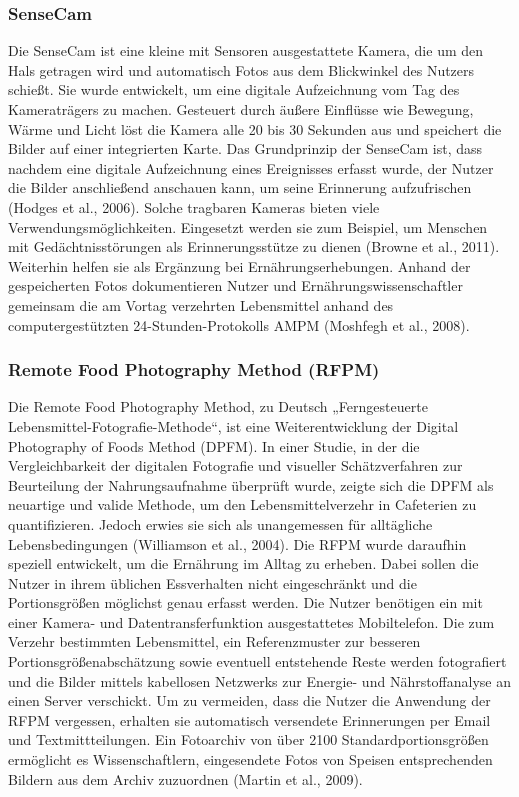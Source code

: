 \subsubsection{SenseCam}

Die SenseCam ist eine kleine mit Sensoren ausgestattete Kamera, die um den Hals getragen wird  und automatisch Fotos aus dem Blickwinkel des Nutzers schießt. Sie wurde entwickelt, um eine digitale Aufzeichnung vom Tag des Kameraträgers zu machen. Gesteuert durch äußere Einflüsse wie Bewegung, Wärme und Licht löst die Kamera alle 20 bis 30 Sekunden aus und speichert die Bilder auf einer integrierten Karte. Das Grundprinzip der SenseCam ist, dass nachdem eine digitale Aufzeichnung eines Ereignisses erfasst wurde, der Nutzer die Bilder anschließend anschauen kann, um seine Erinnerung aufzufrischen (Hodges et al., 2006). Solche tragbaren Kameras bieten viele Verwendungsmöglichkeiten. Eingesetzt werden sie zum Beispiel, um Menschen mit Gedächtnisstörungen als Erinnerungsstütze zu dienen (Browne et al., 2011). Weiterhin helfen sie als Ergänzung bei Ernährungserhebungen. Anhand der gespeicherten Fotos dokumentieren Nutzer und Ernährungswissenschaftler gemeinsam die am Vortag verzehrten Lebensmittel anhand des computergestützten 24-Stunden-Protokolls AMPM (Moshfegh et al., 2008).

\subsubsection{Remote Food Photography Method (RFPM)}

Die Remote Food  Photography Method, zu Deutsch „Ferngesteuerte Lebensmittel-Fotografie-Methode“, ist eine  Weiterentwicklung der Digital Photography of Foods Method (DPFM). In einer Studie, in der die Vergleichbarkeit der digitalen Fotografie und visueller Schätzverfahren zur Beurteilung der Nahrungsaufnahme überprüft wurde, zeigte sich die DPFM als neuartige und valide Methode, um den Lebensmittelverzehr in Cafeterien zu quantifizieren. Jedoch erwies sie sich als  unangemessen für alltägliche Lebensbedingungen (Williamson et al., 2004). Die RFPM wurde daraufhin speziell entwickelt, um die Ernährung im Alltag zu erheben. Dabei sollen die Nutzer in ihrem üblichen Essverhalten nicht eingeschränkt und die Portionsgrößen möglichst genau erfasst werden. Die Nutzer benötigen ein mit einer Kamera- und Datentransferfunktion ausgestattetes Mobiltelefon. Die zum Verzehr bestimmten Lebensmittel, ein Referenzmuster zur besseren Portionsgrößenabschätzung sowie eventuell entstehende Reste werden fotografiert und die Bilder mittels kabellosen Netzwerks zur Energie- und Nährstoffanalyse an einen Server verschickt. Um zu vermeiden, dass die Nutzer die Anwendung der RFPM vergessen, erhalten sie automatisch versendete Erinnerungen per Email und Textmittteilungen.  
Ein Fotoarchiv von über 2100 Standardportionsgrößen ermöglicht es Wissenschaftlern, eingesendete Fotos von Speisen entsprechenden Bildern aus dem Archiv zuzuordnen (Martin et al., 2009).




